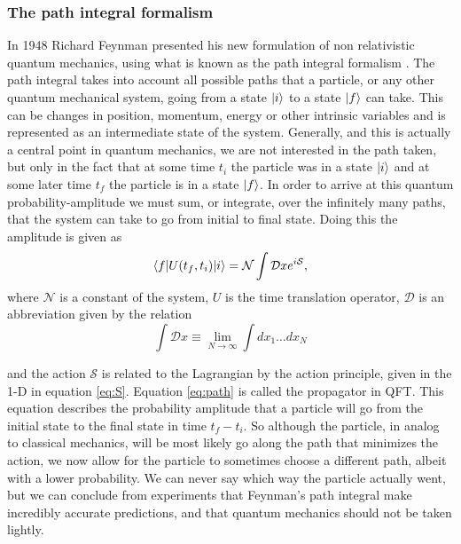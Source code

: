 \subsubsection{The path integral formalism} \label{sec:feynpath}
In 1948 Richard Feynman presented his new formulation of non relativistic quantum mechanics, using what is known as the path integral formalism \cite{feynman1948sta}. The path integral takes into account all possible paths that a particle, or any other quantum mechanical system, going from a state $|i \rangle$ to a state $|f \rangle$ can take. This can be changes in position, momentum, energy or other intrinsic variables and is represented as an intermediate state of the system. Generally, and this is actually a central point in quantum mechanics, we are not interested in the path taken, but only in the fact that at some time $t_{i}$ the particle was in a state $|i \rangle$ and at some later time $t_{f}$ the particle is in a state $|f \rangle$. In order to arrive at this quantum probability-amplitude we must sum, or integrate, over the infinitely many paths, that the system can take to go from initial to final state. Doing this the amplitude is given as \cite{pathinqft}
\begin{equation} \label{eq:path}
	\langle f| U(t_f,t_i) |i \rangle = \mathcal{N} \int \mathcal{D}x e^{i\mathcal{S}},
\end{equation}
where $\mathcal{N}$ is a constant of the system, $U$ is the time translation operator, $\mathcal{D}$ is an abbreviation given by the relation 
\begin{equation}
	\int \mathcal{D} x \equiv \lim_{N \to \infty} \int dx_1 \dots dx_N
\end{equation}

and the action $\mathcal{S}$ is related to the Lagrangian by the action principle, given in the 1-D in equation \ref{eq:S}. Equation \eqref{eq:path} is called the propagator in QFT. This equation describes the probability amplitude that a particle will go from the initial state to the final state in time $t_f - t_i$. So although the particle, in analog to classical mechanics, will be most likely go along the path that minimizes the action, we now allow for the particle to sometimes choose a different path, albeit with a lower probability. We can never say which way the particle actually went, but we can conclude from experiments that Feynman's path integral make incredibly accurate predictions, and that quantum mechanics should not be taken lightly. 


